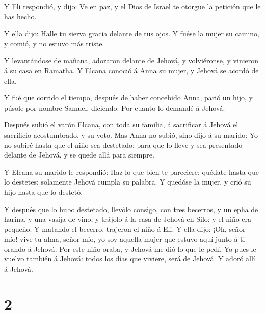  Y Eli respondió, y dijo: Ve en paz, y el Dios de Israel te
otorgue la petición que le has hecho.

 Y ella dijo: Halle tu sierva gracia delante de tus ojos. Y
fuése la mujer su camino, y comió, y no estuvo más triste.

 Y levantándose de mañana, adoraron delante de Jehová, y
volviéronse, y vinieron á su casa en Ramatha. Y Elcana conoció á Anna su
mujer, y Jehová se acordó de ella.

 Y fué que corrido el tiempo, después de haber concebido
Anna, parió un hijo, y púsole por nombre Samuel, diciendo: Por cuanto lo
demandé á Jehová.

 Después subió el varón Elcana, con toda su familia, á
sacrificar á Jehová el sacrificio acostumbrado, y su voto. 
Mas Anna no subió, sino dijo á su marido: Yo no subiré hasta que el niño
sea destetado; para que lo lleve y sea presentado delante de Jehová, y
se quede allá para siempre.

 Y Elcana su marido le respondió: Haz lo que bien te
pareciere; quédate hasta que lo destetes: solamente Jehová cumpla su
palabra. Y quedóse la mujer, y crió su hijo hasta que lo destetó.

 Y después que lo hubo destetado, llevólo consigo, con tres
becerros, y un epha de harina, y una vasija de vino, y trájolo á la casa
de Jehová en Silo: y el niño era pequeño.  Y matando el
becerro, trajeron el niño á Eli.  Y ella dijo: ¡Oh, señor
mío! vive tu alma, señor mío, yo soy aquella mujer que estuvo aquí junto
á ti orando á Jehová.  Por este niño oraba, y Jehová me dió
lo que le pedí.  Yo pues le vuelvo también á Jehová: todos
los días que viviere, será de Jehová. Y adoró allí á Jehová.

\hypertarget{section-1}{%
\section{2}\label{section-1}}

